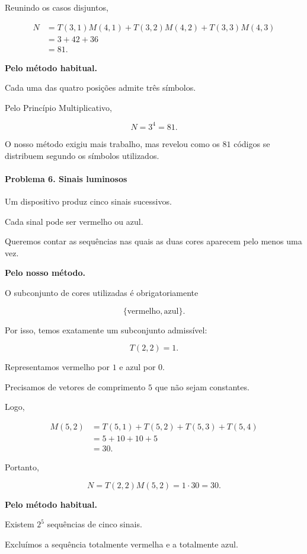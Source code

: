 \documentclass[11pt,a4paper,oneside]{book}
\begin{document}
Reunindo os casos disjuntos,

\[
\begin{aligned}
N
&=T(3,1)M(4,1)
 +T(3,2)M(4,2)
 +T(3,3)M(4,3)\\
&=3+42+36\\
&=\boxed{81}.
\end{aligned}
\]

\textbf{Pelo método habitual.}

Cada uma das quatro posições admite
três símbolos.

Pelo Princípio Multiplicativo,

\[
N=3^4=\boxed{81}.
\]

O nosso método exigiu mais trabalho,
mas revelou como os $81$ códigos
se distribuem segundo os símbolos utilizados.

\paragraph{Problema 6. Sinais luminosos}

Um dispositivo produz cinco sinais sucessivos.

Cada sinal pode ser vermelho ou azul.

Queremos contar as sequências nas quais
as duas cores aparecem pelo menos uma vez.

\textbf{Pelo nosso método.}

O subconjunto de cores utilizadas
é obrigatoriamente

\[
\{\text{vermelho},\text{azul}\}.
\]

Por isso, temos exatamente um
subconjunto admissível:

\[
T(2,2)=1.
\]

Representamos vermelho por $1$
e azul por $0$.

Precisamos de vetores de comprimento $5$
que não sejam constantes.

Logo,

\[
\begin{aligned}
M(5,2)
&=T(5,1)+T(5,2)+T(5,3)+T(5,4)\\
&=5+10+10+5\\
&=30.
\end{aligned}
\]

Portanto,

\[
N=T(2,2)M(5,2)=1\cdot30=30.
\]

\textbf{Pelo método habitual.}

Existem $2^5$ sequências de cinco sinais.

Excluímos a sequência totalmente vermelha
e a totalmente azul.
\end{document}
